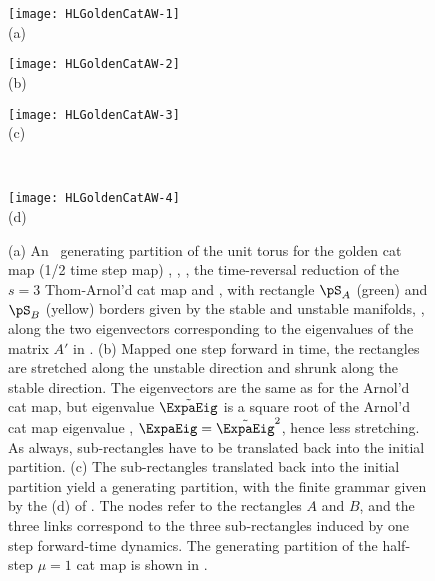 \begin{description}
\begin{figure}\begin{center}
            \begin{minipage}[c]{0.25\textwidth}\begin{center}
\texttt{[image: HLGoldenCatAW-1]}\\(a)
            \end{center}\end{minipage}
            \begin{minipage}[c]{0.40\textwidth}\begin{center}
\texttt{[image: HLGoldenCatAW-2]}\\(b)
            \end{center}\end{minipage}
            \begin{minipage}[c]{0.25\textwidth}\begin{center}
\texttt{[image: HLGoldenCatAW-3]}\\(c)
            \end{center}\end{minipage}
            ~~~
            \begin{minipage}[c]{0.6\textwidth}\begin{center}
\texttt{[image: HLGoldenCatAW-4]}\\(d)
            \end{center}\end{minipage}
\end{center}
  \caption{\label{fig:GoldenCatAW}
(a)
An \AW\ generating partition of the unit torus for the golden cat map
(1/2 time step map) , ,
, the time-reversal reduction of the $s=3$
Thom-Arnol'd cat map  and , with
rectangle $\pS_A$ (green) and $\pS_B$ (yellow) borders given by the
stable and unstable manifolds, \ie, along the two eigenvectors
corresponding to the eigenvalues of the matrix $A'$ in
.
(b)
Mapped one step forward in time, the rectangles are stretched along the
unstable direction and shrunk along the stable direction. The
eigenvectors are the same as for the Arnol'd cat map, but eigenvalue
$\tilde{\ExpaEig}$  is a square root of the Arnol'd
cat map eigenvalue , $\ExpaEig= \tilde{\ExpaEig}^2$,
hence less stretching. As always, sub-rectangles have to be translated
back into the initial partition.
(c)
The sub-rectangles translated back into the initial partition
yield a generating partition, with the finite grammar given by the
{\markGraph}
(d)
of . The nodes refer to the rectangles $A$
and $B$, and the three links correspond to the three sub-rectangles
induced by one step forward-time dynamics.
The generating partition of the half-step $\mu=1$ {\PV} cat map is shown
in .
}
\end{figure}


\end{description}
